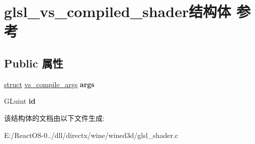 \hypertarget{structglsl__vs__compiled__shader}{}\section{glsl\+\_\+vs\+\_\+compiled\+\_\+shader结构体 参考}
\label{structglsl__vs__compiled__shader}
\subsection*{Public 属性}
\begin{DoxyCompactItemize}
\item 
\mbox{\label{structglsl__vs__compiled__shader_aa180becd76a093d1fb8bf3d770911f72}} 
\hyperlink{interfacestruct}{struct} \hyperlink{structvs__compile__args}{vs\+\_\+compile\+\_\+args} {\bfseries args}
\item 
\mbox{\label{structglsl__vs__compiled__shader_a47f47c3e7053c3c854a0b618ff4c716a}} 
G\+Luint {\bfseries id}
\end{DoxyCompactItemize}


该结构体的文档由以下文件生成\+:\begin{DoxyCompactItemize}
\item 
E\+:/\+React\+O\+S-\/0../dll/directx/wine/wined3d/glsl\+\_\+shader.\+c\end{DoxyCompactItemize}
